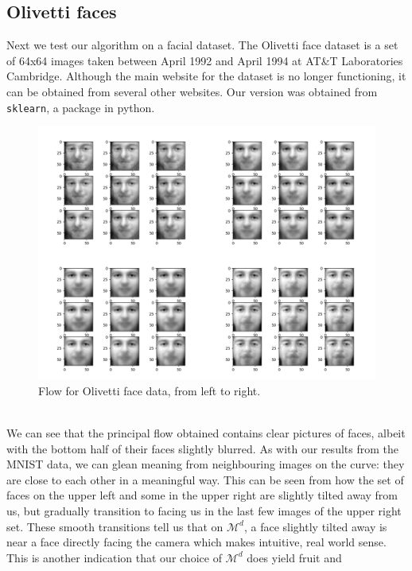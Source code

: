 \documentclass[12pt]{report}
\begin{document}
\subsection{Olivetti faces}
Next we test our algorithm on a facial dataset. The Olivetti face dataset 
is a set of 64x64 images taken between 
April 1992 and April 1994 at AT\&T Laboratories Cambridge. Although the main website 
for the dataset is no longer functioning, it can be obtained from several other 
websites. Our version was obtained from \texttt{sklearn}, a package in python.
\begin{figure}[ht]
    \begin{center}
        \includegraphics[scale=0.35]{main_olivetti_30_01.png}
        \caption{Flow for Olivetti face data, from left to right.}
        \label{fig:olivettiflows}
    \end{center}
\end{figure}\\
We can see that the principal flow obtained contains 
clear pictures of faces, albeit with the bottom half of their
faces slightly blurred. 
As with our results from the MNIST data,
we can glean meaning from neighbouring images on the curve:
they are close to each other in a meaningful way. This can be seen from how the set 
of faces on the upper left and some in the upper right 
are slightly tilted away from us, but gradually 
transition to facing us in the last few images of the upper right set.
These smooth transitions tell us that on $\mathcal{M}^d$,
a face slightly tilted away is near a face directly facing
the camera which makes intuitive, real world sense.
This is another indication that our choice of $\mathcal{M}^d$ does yield fruit and
\end{document}
